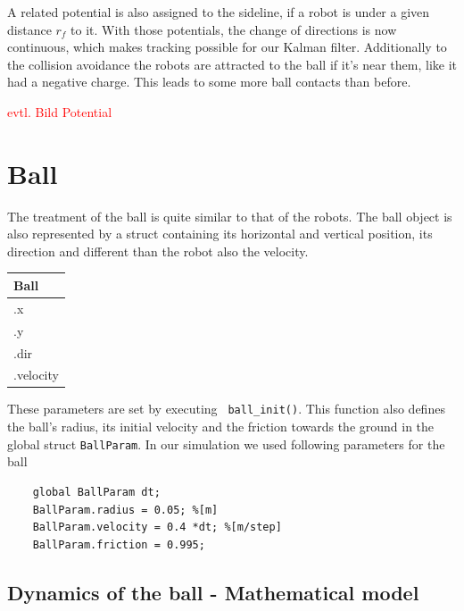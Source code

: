 A related potential is also assigned to the sideline, if a robot is under a given distance $r_f$ to it. With those potentials, the change of directions is now continuous, which makes tracking possible for our Kalman filter. Additionally to the collision avoidance the robots are attracted to the ball if it's near them, like it had a negative charge. This leads to some more ball contacts than before.

\textcolor{red}{evtl. Bild Potential}



\section{Ball} \label{Ballsection}

The treatment of the ball is quite similar to that of the robots. The ball object is also represented by a struct containing its horizontal and vertical position, its direction and different than the robot also the velocity.
\begin{center}
	\begin{tabular}{| l |} \hline
		Ball \\ \hline
		.x \\
		.y \\
		.dir \\
		.velocity \\ \hline
	\end{tabular}
\end{center}
 These parameters are set by executing \texttt{ ball\_init()}. This function also defines the ball's radius, its initial velocity and the friction towards the ground in the global struct \texttt{BallParam}. In our simulation we used following parameters for the ball
\begin{lstlisting}
    global BallParam dt;
    BallParam.radius = 0.05; %[m]
    BallParam.velocity = 0.4 *dt; %[m/step]
    BallParam.friction = 0.995;
\end{lstlisting}
 
\subsection*{Dynamics of the ball - Mathematical model}

